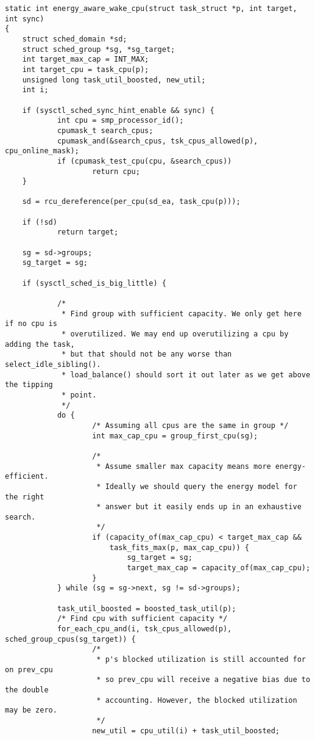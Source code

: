 \documentclass{article}
\begin{document}
\begin{verbatim}
static int energy_aware_wake_cpu(struct task_struct *p, int target, int sync)
{
    struct sched_domain *sd;
    struct sched_group *sg, *sg_target;
    int target_max_cap = INT_MAX;
    int target_cpu = task_cpu(p);
    unsigned long task_util_boosted, new_util;
    int i;

    if (sysctl_sched_sync_hint_enable && sync) {
            int cpu = smp_processor_id();
            cpumask_t search_cpus;
            cpumask_and(&search_cpus, tsk_cpus_allowed(p), cpu_online_mask);
            if (cpumask_test_cpu(cpu, &search_cpus))
                    return cpu;
    }

    sd = rcu_dereference(per_cpu(sd_ea, task_cpu(p)));

    if (!sd)
            return target;

    sg = sd->groups;
    sg_target = sg;

    if (sysctl_sched_is_big_little) {

            /*
             * Find group with sufficient capacity. We only get here if no cpu is
             * overutilized. We may end up overutilizing a cpu by adding the task,
             * but that should not be any worse than select_idle_sibling().
             * load_balance() should sort it out later as we get above the tipping
             * point.
             */
            do {
                    /* Assuming all cpus are the same in group */
                    int max_cap_cpu = group_first_cpu(sg);

                    /*
                     * Assume smaller max capacity means more energy-efficient.
                     * Ideally we should query the energy model for the right
                     * answer but it easily ends up in an exhaustive search.
                     */
                    if (capacity_of(max_cap_cpu) < target_max_cap &&
                        task_fits_max(p, max_cap_cpu)) {
                            sg_target = sg;
                            target_max_cap = capacity_of(max_cap_cpu);
                    }
            } while (sg = sg->next, sg != sd->groups);

            task_util_boosted = boosted_task_util(p);
            /* Find cpu with sufficient capacity */
            for_each_cpu_and(i, tsk_cpus_allowed(p), sched_group_cpus(sg_target)) {
                    /*
                     * p's blocked utilization is still accounted for on prev_cpu
                     * so prev_cpu will receive a negative bias due to the double
                     * accounting. However, the blocked utilization may be zero.
                     */
                    new_util = cpu_util(i) + task_util_boosted;


\end{verbatim}
\end{document}
